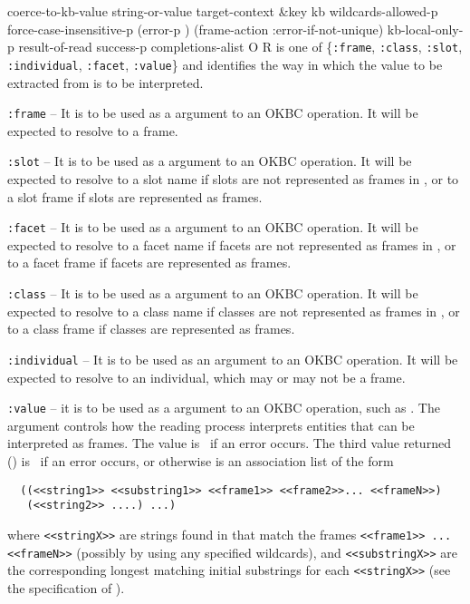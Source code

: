 \begin{okbcop}{coerce-to-kb-value}{ string-or-value target-context \&key kb wildcards-allowed-p force-case-insensitive-p (error-p \true) (frame-action :error-if-not-unique) kb-local-only-p} { result-of-read success-p completions-alist } { O } { R } {  }
   is one of \{{\tt :frame}, {\tt :class},
  {\tt :slot}, {\tt :individual}, {\tt :facet}, {\tt :value}\} and
  identifies the way in which the value to be extracted from
   is to be interpreted.
  \bitem
  \item {\tt :frame} -- It is to be used as a  argument to
  an OKBC operation.  It will be expected to resolve to a frame.
  \item {\tt :slot} -- It is to be used as a  argument to
  an OKBC operation.  It will be expected to resolve to a slot name if slots
  are not represented as frames in , or to a slot frame if slots
  are represented as frames.
  \item {\tt :facet} -- It is to be used as a  argument to
  an OKBC operation.  It will be expected to resolve to a facet name if facets
  are not represented as frames in , or to a facet frame if facets
  are represented as frames.
  \item {\tt :class} -- It is to be used as a  argument to
  an OKBC operation.  It will be expected to resolve to a class name if classes
  are not represented as frames in , or to a class frame if classes
  are represented as frames.
  \item {\tt :individual} -- It is to be used as an 
  argument to an OKBC operation.  It will be expected to resolve to an
  individual, which may or may not be a frame.
  \item {\tt :value} -- it is to be used as a  argument to
  an OKBC operation, such as .
  \eitem
  The  argument
  controls how the reading process interprets entities that can be interpreted
  as frames.  The  value is \false\ if an
  error occurs.  The third value returned () is
  \false\ if an error occurs, or otherwise is an association list of
  the form
  \begin{verbatim}
  ((<<string1>> <<substring1>> <<frame1>> <<frame2>>... <<frameN>>)
   (<<string2>> ....) ...)
  \end{verbatim}
  where {\tt <<stringX>>} are strings found in 
  that match the frames {\tt<<frame1>> ... <<frameN>>}
  (possibly by using any specified wildcards), and \verb|<<substringX>>|
  are the corresponding
  longest matching initial substrings for each {\tt<<stringX>>} (see the
  specification of ).
  \bitem
  \item {}

\end{okbcop}
